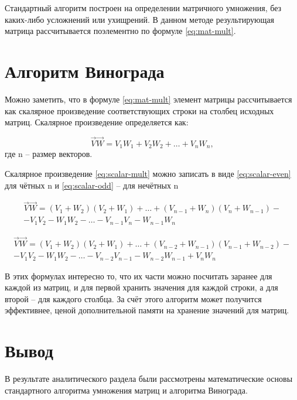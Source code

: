 Стандартный алгоритм построен на определении матричного умножения, без каких-либо усложнений или ухищрений. В данном методе результирующая матрица рассчитывается поэлементно по формуле \ref{eq:mat-mult}.

\section{Алгоритм Винограда}

Можно заметить, что в формуле \ref{eq:mat-mult} элемент матрицы рассчитывается как скалярное произведение соответствующих строки на столбец исходных матриц. Скалярное произведение определяется как:

\begin{equation}
	\label{eq:scalar-mult}
		\vec{V}\vec{W} = V_1W_1 + V_2W_2 + \dots + V_nW_n,
\end{equation}
где n – размер векторов.

Скалярное произведение \ref{eq:scalar-mult} можно записать в виде \ref{eq:scalar-even} для чётных n и \ref{eq:scalar-odd} – для нечётных n

\begin{equation}
	\label{eq:scalar-even}
	\begin{matrix}
		\vec{V}\vec{W} = (V_1 + W_2)(V_2 + W_1) + \dots + (V_{n-1} + W_n)(V_n + W_{n-1}) - \\ - V_1V_2 - W_1W_2 - \dots - V_{n-1}V_n - W_{n-1}W_n
	\end{matrix}
\end{equation}


\begin{equation}
	\label{eq:scalar-odd}
	\begin{matrix}
		\vec{V}\vec{W} = (V_1 + W_2)(V_2 + W_1) + \dots + (V_{n-2} + W_{n-1})(V_{n-1} + W_{n-2}) - \\ - V_1V_2 - W_1W_2 - \dots - V_{n-2}V_{n-1} - W_{n-2}W_{n-1} + V_nW_n
	\end{matrix}
\end{equation}

В этих формулах  интересно то, что их части можно посчитать заранее для каждой из матриц, и для первой хранить значения для каждой строки, а для второй – для каждого столбца. За счёт этого алгоритм может получится эффективнее, ценой дополнительной памяти на хранение значений для матриц.

\section*{Вывод}
В результате аналитического раздела были рассмотрены математические основы стандартного алгоритма умножения матриц и алгоритма Винограда.

\clearpage
